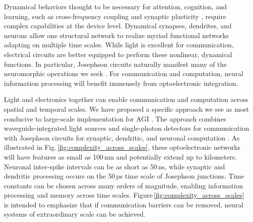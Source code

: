 \documentclass[twocolumn]{article}
\begin{document}
Dynamical behaviors thought to be necessary for attention, cognition, and learning, such as cross-frequency coupling \cite{bu2006} and synaptic plasticity \cite{mage2012,ab2008,fudr2005}, require complex capabilities at the device level. Dynamical synapses, dendrites, and neurons allow one structural network to realize myriad functional networks adapting on multiple time scales. While light is excellent for communication, electrical circuits are better equipped to perform these nonlinear, dynamical functions. In particular, Josephson circuits naturally manifest many of the neuromorphic operations we seek \cite{sh2018,sh2020}. For communication and computation, neural information processing will benefit immensely from optoelectronic integration.

Light and electronics together can enable communication and computation across spatial and temporal scales. We have proposed a specific approach we see as most conducive to large-scale implementation for AGI \cite{shbu2017,sh2018,sh2019,sh2020}. The approach combines waveguide-integrated light sources and single-photon detectors for communication \cite{shbu2017,buch2017} with Josephson circuits for synaptic, dendritic, and neuronal computation \cite{sh2018,sh2020}. As illustrated in Fig.\,\ref{fig:complexity_across_scales}, these optoelectronic networks will have features as small as 100\,nm and potentially extend up to kilometers. Neuronal inter-spike intervals can be as short as 50\,ns, while synaptic and dendritic processing occurs on the 50\,ps time scale of Josephson junctions. Time constants can be chosen across many orders of magnitude, enabling information processing and memory across time scales. Figure\,\ref{fig:complexity_across_scales} is intended to emphasize that if communication barriers can be removed, neural systems of extraordinary scale can be achieved.

\begin{figure}[tb]
\end{figure}
\end{document}
